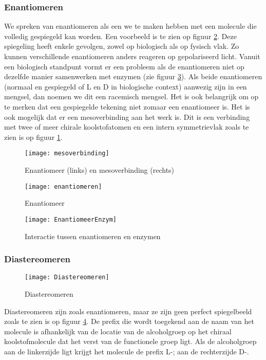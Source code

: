 \documentclass[a4paper,kul]{kulakarticle} %
\begin{document}
\subsubsection{Enantiomeren}
\label{sec:enantiomeren}
We spreken van enantiomeren als een we te maken hebben met een molecule die volledig gespiegeld kan worden. Een voorbeeld is te zien op figuur \ref{fig:enantiomeren}. Deze spiegeling heeft enkele gevolgen, zowel op biologisch als op fysisch vlak. Zo kunnen verschillende enantiomeren anders reageren op gepolariseerd licht. Vanuit een biologisch standpunt vormt er een probleem als de enantiomeren niet op dezelfde manier samenwerken met enzymen (zie figuur \ref{fig:enantiomeerenzym}). Als beide enantiomeren (normaal en gespiegeld of L en D in biologische context) aanwezig zijn in een mengsel, dan noemen we dit een racemisch mengsel.
Het is ook belangrijk om op te merken dat een gespiegelde tekening niet zomaar een enantiomeer is. Het is ook mogelijk dat er een mesoverbinding aan het werk is. Dit is een verbinding met twee of meer chirale koolstofatomen en een intern symmetrievlak zoals te zien is op figuur \ref{fig:mesoverbinding}. 
\begin{figure}
	\centering
	\texttt{[image: mesoverbinding]}
	\caption[Mesoverbinding]{Enantiomeer (links) en mesoverbinding (rechts)}
	\label{fig:mesoverbinding}
\end{figure}

\begin{figure}[htbp]
	\centering
	\texttt{[image: enantiomeren]}
	\caption[Enantiomeer]{Enantiomeer}
	\label{fig:enantiomeren}
\end{figure}
\begin{figure}[htbp]
	\centering
	\texttt{[image: EnantiomeerEnzym]}
	\caption[Enantiomeer en enzym]{Interactie tussen enantiomeren en enzymen}
	\label{fig:enantiomeerenzym}
\end{figure}


\subsubsection{Diastereomeren}
\begin{figure}[htbp]
	\centering
	\texttt{[image: Diastereomeren]}
	\caption[Diastereomeren]{Diastereomeren}
	\label{fig:diastereomeren}
\end{figure}
Diastereomeren zijn zoals enantiomeren, maar ze zijn geen perfect spiegelbeeld zoals te zien is op figuur \ref{fig:diastereomeren}. De prefix die wordt toegekend aan de naam van het molecule is afhankelijk van de locatie van de alcoholgroep op het chiraal koolstofmolecule dat het verst van de functionele groep ligt. Als de alcoholgroep aan de linkerzijde ligt krijgt het molecule de prefix L-; aan de rechterzijde D-.
\end{document}
